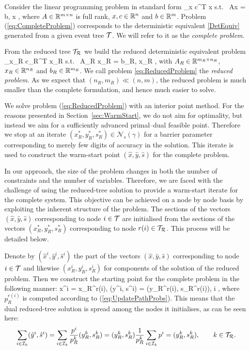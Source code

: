 Consider the linear programming problem in standard form
\be  \label{eq:CompleteProblem}
  \min_x\; c^T x \;\quad \mbox{s.t. }\; Ax = b, \;\; x ,
\ee
where $A \in \mathbb{R}^{m \times n}$ is full rank, 
$x, c \in \mathbb{R}^{n}$ and $b \in \mathbb{R}^{m}$. 
Problem (\ref{eq:CompleteProblem})
corresponds to the deterministic equivalent \eqref{DetEquiv} generated from a
given event tree $\mathcal{T}$. We will refer to it as the 
{\em complete problem}.

From the reduced tree $\mathcal{T}_\mathcal{R}$ 
we build the reduced deterministic 
equivalent problem
\be \label{eq:ReducedProblem}
\min_{x_R}\; c_R^T x_R \;\quad \mbox{s.t. }\; A_R x_R = b_R, \; x_R ,
\ee
with $A_R \in \mathbb{R}^{m_R\times n_R}$, $x_R \in 
\mathbb{R}^{n_R}$ and $b_R \in \mathbb{R}^{m_R}$. 
We call problem \eqref{eq:ReducedProblem} the {\em reduced problem}.
As we expect that $(n_R, m_R) \ll (n, m)$, the reduced problem is 
much smaller than the complete formulation, and hence much easier to solve.

We solve problem (\ref{eq:ReducedProblem}) with an interior point method. 
For the reasons presented in Section~\ref{sec:WarmStart}, we do not 
aim for optimality, but instead we aim for a sufficiently advanced 
primal--dual feasible point. Therefore we stop at an iterate
$(x_R^*,y_R^*,s_R^*)\in\mathcal{N}_s(\gamma)$ for a
barrier parameter corresponding to merely few digits of accuracy 
in the solution.
This iterate is used to construct the warm-start point
$(\hat{x}, \hat{y}, \hat{s})$ for the complete problem.

In our approach, the size of the problem changes in both 
the number of constraints and the number of variables.
Therefore, we are faced with the challenge of using 
the reduced-tree solution to provide a warm-start iterate for 
the complete system.
This objective can be achieved on a node by node basis 
by exploiting the inherent structure of the problem.
The sections of the vectors
$(\hat{x}, \hat{y}, \hat{s})$ corresponding to node $i\in\mathcal{T}$ are
initialised from the sections of the vectors 
$(x_R^*,y_R^*,s_R^*)$ corresponding to node $r(i)\in\mathcal{T}_\mathcal{R}$. This process
will be detailed below.

Denote by $(\hat x^{i}, \hat y^{i}, \hat s^{i})$ the part of the vectors
$(\hat{x}, \hat{y}, \hat{s})$ corresponding to node $i\in\mathcal{T}$ and likewise
$(x_R^{i}, y_R^{i},  s_R^{i})$ for components of the solution of the
reduced problem. Then we construct the starting point for the complete
problem in the following manner:
\be  \label{eq:WarmstartSolution}
  \hat x^{i} = x_R^{r(i)}, \qquad 
 (\hat y^{i}, \hat s^{i}) =  (y_R^{r(i)}, s_R^{r(i)}),
  \qquad i \in \Ctree,
\ee
where $p^{r(i)}_R$ is computed according to (\ref{eq:UpdatePathProbs}).
This means that the dual reduced-tree solution is spread among the
nodes it initialises, as can be seen here:
\[
   \sum_{i \in \mathcal{I}_k} (\hat y^i, \hat s^i)
  = \sum_{i \in \mathcal{I}_k} \frac{p^i}{p^k_R} (y^k_R, s^k_R)
  = (y^k_R, s^k_R) \frac{1}{p^k_R} \sum_{i \in \mathcal{I}_k} p^i 
  = (y^k_R, s^k_R), \qquad k \in \mathcal{T}_\mathcal{R}.
\]

